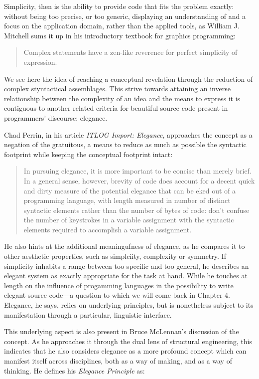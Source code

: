 Simplicity, then is the ability to provide code that fits the problem exactly: without being too precise, or too generic, displaying an understanding of and a focus on the application domain, rather than the applied tools, as William J. Mitchell sums it up in his introductory textbook for graphics programming:

\begin{quote}
  Complex statements have a zen-like reverence for perfect simplicity of expression.\cite{mitchell_art_1987}
\end{quote}

We see here the idea of reaching a conceptual revelation through the reduction of complex styntactical assemblages. This strive towards attaining an inverse relationship between the complexity of an idea and the means to express it is contiguous to another related criteria for beautiful source code present in programmers' discourse: elegance.

Chad Perrin, in his article \emph{ITLOG Import: Elegance}, approaches the concept as a negation of the gratuitous, a means to reduce as much as possible the syntactic footprint while keeping the conceptual footprint intact:

\begin{quote}
  In pursuing elegance, it is more important to be concise than merely brief. In a general sense, however, brevity of code does account for a decent quick and dirty measure of the potential elegance that can be eked out of a programming language, with length measured in number of distinct syntactic elements rather than the number of bytes of code: don't confuse the number of keystrokes in a variable assignment with the syntactic elements required to accomplish a variable assignment.\cite{perrin_itlog_2006}
\end{quote}

He also hints at the additional meaningufness of elegance, as he compares it to other aesthetic properties, such as simplciity, complexity or symmetry. If simplicity inhabits a range between too specific and too general, he describes an elegant system as exactly appropriate for the task at hand. While he touches at length on the influence of progamming languages in the possibility to write elegant source code—a question to which we will come back in Chapter 4. Elegance, he says, relies on underlying principles, but is nonetheless subject to its manifestation through a particular, linguistic interface.

This underlying aspect is also present in Bruce McLennan's discussion of the concept. As he approaches it through the dual lens of structural engineering, this indicates that he also considers elegance as a more profound concept which can manifest itself across disciplines, both as a way of making, and as a way of thinking\cite{mclennan_who_1997}. He defines his \emph{Elegance Principle} as:

